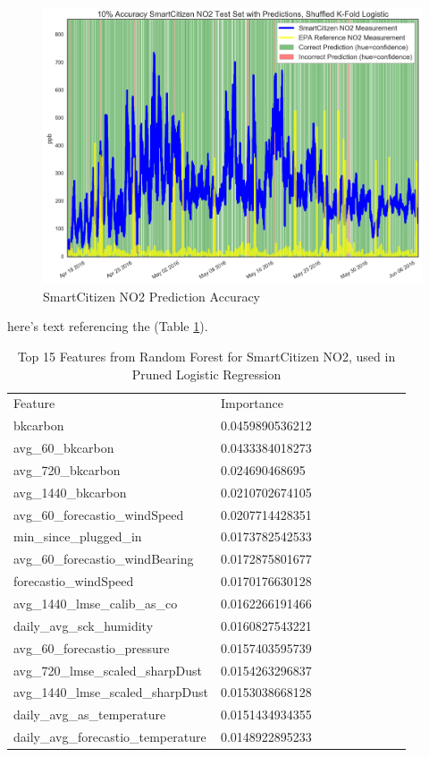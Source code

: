 \begin{figure}[htb]
 	\includegraphics[width=\textwidth]{figs/sck_no2_10_logistic_predictions}               
 	 \caption{SmartCitizen NO2 Prediction Accuracy}
  	\label{fig:sck_no2_10_logistic_predictions}
\end{figure}

here's text referencing the (Table \ref{tab:sck_no2_randomforest_features}).

\begin{table}[H]
\centering
\begin{tabular}{lllllllll}
\\
\\
\toprule
Feature & Importance \\
\midrule

bkcarbon & 0.0459890536212 \\
avg\_60\_bkcarbon & 0.0433384018273 \\
avg\_720\_bkcarbon & 0.024690468695 \\
avg\_1440\_bkcarbon & 0.0210702674105 \\
avg\_60\_forecastio\_windSpeed & 0.0207714428351 \\
min\_since\_plugged\_in & 0.0173782542533 \\
avg\_60\_forecastio\_windBearing & 0.0172875801677 \\
forecastio\_windSpeed & 0.0170176630128 \\
avg\_1440\_lmse\_calib\_as\_co & 0.0162266191466 \\
daily\_avg\_sck\_humidity & 0.0160827543221 \\
avg\_60\_forecastio\_pressure & 0.0157403595739 \\
avg\_720\_lmse\_scaled\_sharpDust & 0.0154263296837 \\
avg\_1440\_lmse\_scaled\_sharpDust & 0.0153038668128 \\
daily\_avg\_as\_temperature & 0.0151434934355 \\
daily\_avg\_forecastio\_temperature & 0.0148922895233 \\
\bottomrule
\end{tabular}
\label{tab:sck_no2_randomforest_features}
\caption{Top 15 Features from Random Forest for SmartCitizen NO2, used in Pruned Logistic Regression}
\end{table}

